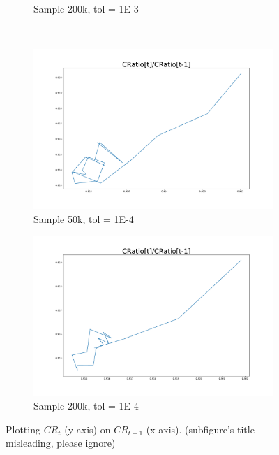 \documentclass[]{article}
\begin{document}
\begin{figure}
\begin{subfigure}[b]{0.45\textwidth}
		\caption{Sample 200k, tol = 1E-3}
		\label{fig:Cratio-200k-Baseline}
	\end{subfigure}\\
	\begin{subfigure}[b]{0.45\textwidth}
		\centering
		\includegraphics[width=1.2\textwidth]{../50kSample_BaseCal_TolE-4/CRatio.pdf}
		\caption{Sample 50k, tol = 1E-4}
		\label{fig:Cratio-50k}
	\end{subfigure}
	\hfill
	\begin{subfigure}[b]{0.45\textwidth}
		\centering
		\includegraphics[width=1.2\textwidth]{../200kSample_BaseCal_TolE-4/CRatio.pdf}
		\caption{Sample 200k, tol = 1E-4}
		\label{fig:Cratio-200k}
	\end{subfigure}
	\caption{Plotting $CR_t$ (y-axis) on $CR_{t-1}$ (x-axis). (subfigure's title misleading, please ignore)}
	\label{fig:CRatio}
\end{figure}
\end{document}
